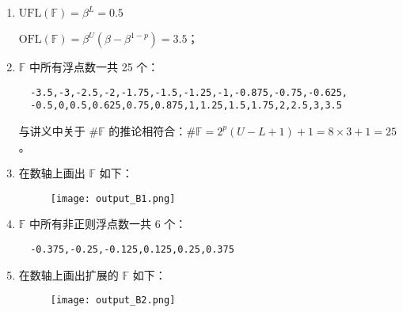 \documentclass[lang=cn,a4paper,newtx,bibend=bibtex]{elegantpaper}
\begin{document}
\begin{enumerate}
\item $\text{UFL}(\mathbb{F}) = \beta^L = 0.5$

      $\text{OFL}(\mathbb{F}) = \beta^U(\beta - \beta^{1-p}) = 3.5$；
\item $\mathbb{F}$ 中所有浮点数一共 25 个：
\begin{lstlisting}
  -3.5,-3,-2.5,-2,-1.75,-1.5,-1.25,-1,-0.875,-0.75,-0.625,
  -0.5,0,0.5,0.625,0.75,0.875,1,1.25,1.5,1.75,2,2.5,3,3.5
\end{lstlisting}
与讲义中关于 $\#\mathbb{F}$ 的推论相符合：$\#\mathbb{F} = 2^p(U-L+1)+1 = 8\times 3 + 1 = 25$。
\item 在数轴上画出 $\mathbb{F}$ 如下：
\begin{figure}[H]
  \centering
  \texttt{[image: output\_B1.png]}
\end{figure}
\item $\mathbb{F}$ 中所有非正则浮点数一共 6 个：
\begin{lstlisting}
  -0.375,-0.25,-0.125,0.125,0.25,0.375
\end{lstlisting}
\item 在数轴上画出扩展的 $\mathbb{F}$ 如下：
\begin{figure}[H]
  \centering
  \texttt{[image: output\_B2.png]}
\end{figure}
\end{enumerate}
\end{document}
